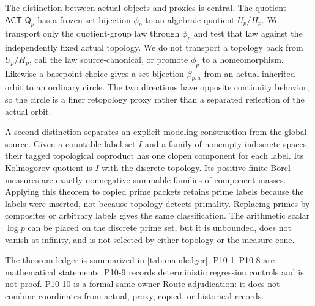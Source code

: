 \documentclass[11pt]{article}
\theoremstyle{definition}
\newcommand{\ACTQ}{\mathsf{ACT\mbox{-}Q}_p}
\begin{document}
The distinction between actual objects and proxies is central.  The quotient $\ACTQ$ has a frozen set bijection $\phi_p$ to an algebraic quotient $U_p/H_p$.  We transport only the quotient-group law through $\phi_p$ and test that law against the independently fixed actual topology.  We do not transport a topology back from $U_p/H_p$, call the law source-canonical, or promote $\phi_p$ to a homeomorphism.  Likewise a basepoint choice gives a set bijection $\beta_{p,a}$ from an actual inherited orbit to an ordinary circle.  The two directions have opposite continuity behavior, so the circle is a finer retopology proxy rather than a separated reflection of the actual orbit.

A second distinction separates an explicit modeling construction from the global source.  Given a countable label set $I$ and a family of nonempty indiscrete spaces, their tagged topological coproduct has one clopen component for each label.  Its Kolmogorov quotient is $I$ with the discrete topology.  Its positive finite Borel measures are exactly nonnegative summable families of component masses.  Applying this theorem to copied prime packets retains prime labels because the labels were inserted, not because topology detects primality.  Replacing primes by composites or arbitrary labels gives the same classification.  The arithmetic scalar $\log p$ can be placed on the discrete prime set, but it is unbounded, does not vanish at infinity, and is not selected by either topology or the measure cone.

The theorem ledger is summarized in \cref{tab:mainledger}.  P10-1--P10-8 are mathematical statements.  P10-9 records deterministic regression controls and is not proof.  P10-10 is a formal same-owner Route adjudication: it does not combine coordinates from actual, proxy, copied, or historical records.
\end{document}

